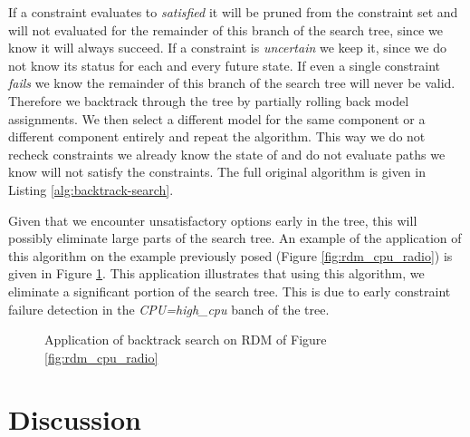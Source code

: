 If a constraint evaluates to \emph{satisfied} it will be pruned from the constraint set and will not evaluated for the remainder of this branch of the search tree, since we know it will always succeed. If a constraint is \emph{uncertain} we keep it, since we do not know its status for each and every future state. If even a single constraint \emph{fails} we know the remainder of this branch of the search tree will never be valid. Therefore we backtrack through the tree by partially rolling back model assignments. We then select a different model for the same component or a different component entirely and repeat the algorithm. This way we do not recheck constraints we already know the state of and do not evaluate paths we know will not satisfy the constraints. The full original algorithm is given in Listing \ref{alg:backtrack-search}. 

Given that we encounter unsatisfactory options early in the tree, this will possibly eliminate large parts of the search tree. An example of the application of this algorithm on the example previously posed (Figure \ref{fig:rdm_cpu_radio}) is given in Figure \ref{fig:search_cpu_radio}. This application illustrates that using this algorithm, we eliminate a significant portion of the search tree. This is due to early constraint failure detection in the \emph{CPU=high\_cpu} banch of the tree.



\begin{figure}

\caption{Application of backtrack search on RDM of Figure \ref{fig:rdm_cpu_radio}}
\label{fig:search_cpu_radio}
\end{figure}


\section{Discussion}

